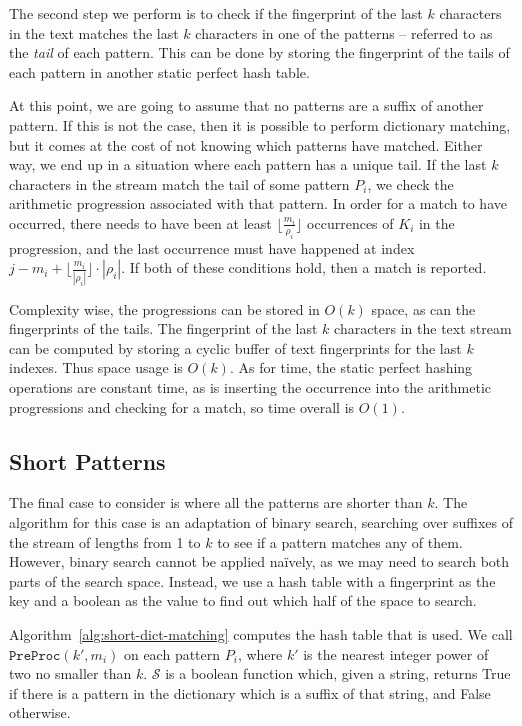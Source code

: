 \documentclass[ %
                    author={Dominic Joseph Moylett},
                    degree={MEng},
                     title={Dictionary Matching with Fingerprints},
                  subtitle={An Empirical Analysis},
                      type={research},
                      year={2015} ]{dissertation}
\begin{document}
The second step we perform is to check if the fingerprint of the last $k$ characters in the text matches the last $k$ characters in one of the patterns  --  referred to as the \textit{tail} of each pattern. This can be done by storing the fingerprint of the tails of each pattern in another static perfect hash table.

At this point, we are going to assume that no patterns are a suffix of another pattern. If this is not the case, then it is possible to perform dictionary matching, but it comes at the cost of not knowing which patterns have matched. Either way, we end up in a situation where each pattern has a unique tail. If the last $k$ characters in the stream match the tail of some pattern $P_i$, we check the arithmetic progression associated with that pattern. In order for a match to have occurred, there needs to have been at least $\lfloor\frac{m_i}{\rho_i}\rfloor$ occurrences of $K_i$ in the progression, and the last occurrence must have happened at index $j - m_i + \lfloor\frac{m_i}{|\rho_i|}\rfloor\cdot|\rho_i|$. If both of these conditions hold, then a match is reported.

Complexity wise, the progressions can be stored in $O(k)$ space, as can the fingerprints of the tails. The fingerprint of the last $k$ characters in the text stream can be computed by storing a cyclic buffer of text fingerprints for the last $k$ indexes. Thus space usage is $O(k)$. As for time, the static perfect hashing operations are constant time, as is inserting the occurrence into the arithmetic progressions and checking for a match, so time overall is $O(1)$.

\subsection{Short Patterns}
\label{ssec:short-theory}

The final case to consider is where all the patterns are shorter than $k$. The algorithm for this case is an adaptation of binary search, searching over suffixes of the stream of lengths from 1 to $k$ to see if a pattern matches any of them. However, binary search cannot be applied na\"{i}vely, as we may need to search both parts of the search space. Instead, we use a hash table with a fingerprint as the key and a boolean as the value to find out which half of the space to search.

Algorithm~\ref{alg:short-dict-matching} computes the hash table that is used. We call $\texttt{PreProc}(k',m_i)$ on each pattern $P_i$, where $k'$ is the nearest integer power of two no smaller than $k$. $\mathcal{S}$ is a boolean function which, given a string, returns True if there is a pattern in the dictionary which is a suffix of that string, and False otherwise.
\end{document}
